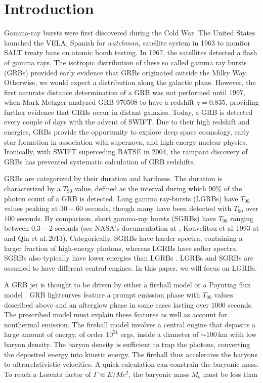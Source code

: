 \documentclass{article}
\begin{document}
\newpage
\thispagestyle{empty}
\mbox{}
\newpage

{\centering\tableofcontents}
\setcounter{page}{1}
\newpage
\thispagestyle{empty}
\mbox{}
\newpage

\section{Introduction}
Gamma-ray bursts were first discovered during the Cold War. The United States launched the VELA, Spanish for \textit{watchman}, satellite system in 1963 to monitor SALT treaty bans on atomic bomb testing. In 1967, the satellites detected a flash of gamma rays. The isotropic distribution of these so called gamma ray bursts (GRBs) provided early evidence that GRBs originated outside the Milky Way. Otherwise, we would expect a distribution along the galactic plane. However, the first accurate distance determination of a GRB was not performed until 1997, when Mark Metzger analyzed GRB 970508 to have a redshift $z=0.835$, providing further evidence that GRBs occur in distant galaxies. Today, a GRB is detected every couple of days with the advent of SWIFT. Due to their high redshift and energies, GRBs provide the opportunity to explore deep space cosmology, early star formation in association with supernova, and high-energy nuclear physics. Ironically, with SWIFT superceding BATSE in 2004, the rampant discovery of GRBs has prevented systematic calculation of GRB redshifts.

GRBs are categorized by their duration and hardness. The duration is characterized by a $T_{90}$ value, defined as the interval during which $90\%$ of the photon count of a GRB is detected. Long gamma ray-bursts (LGRBs) have $T_{90}$ values peaking at $30-60$ seconds, though many have been detected with $T_{90}$ over $100$ seconds. By comparison, short gamma-ray bursts (SGRBs) have $T_{90}$ ranging between $0.3-2$ seconds (see NASA's documentation at \cite{bworld}, Kouvelitou et al.\,1993 at \cite{Kouv:1993ap} and Qin et al.\,2013\cite{Qin:2013}). Categorically, SGRBs have harder spectra, containing a larger fraction of high-energy photons, whereas LGRBs have softer spectra. SGRBs also typically have lower energies than LGRBs \cite{Levan:2007tf}. LGRBs and SGRBs are assumed to have different central engines. In this paper, we will focus on LGRBs.

A GRB jet is thought to be driven by either a fireball model \cite{Rosswog:2007ap} or a Poynting flux model \cite{Metzger:2010pp}. GRB lightcurves feature a prompt emission phase with $T_{90}$ values described above and an afterglow phase in some cases lasting over $1000$ seconds. The prescribed model must explain these features as well as account for nonthermal emission. 
The fireball model involves a central engine that deposits a large amount of energy, of order $10^{51}$ ergs, inside a diameter of $\sim 100$\,km with low baryon density. The baryon density is sufficient to trap the photons, converting the deposited energy into kinetic energy. The fireball thus accelerates the baryons to ultrarelativistic velocities. A quick calculation can constrain the baryonic mass. To reach a Lorentz factor of $\Gamma \approx E/M c^2$, the baryonic mass $M_b$ must be less than
\end{document}
